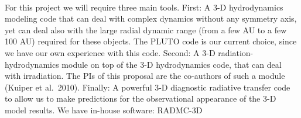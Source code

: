 \vspace{0.5em}
\\
%
For this project we will require three main tools.  First: A 3-D
hydrodynamics modeling code that can deal with complex dynamics without any
symmetry axis, yet can deal also with the large radial dynamic range (from a
few AU to a few 100 AU) required for these objects. The PLUTO code is our
current choice, since we have our own experience with this code.  Second: A
3-D radiation-hydrodynamics module on top of the 3-D hydrodynamics code,
that can deal with irradiation. The PIs of this proposal are the co-authors
of such a module (Kuiper et al.~2010). 
Finally: A powerful 3-D diagnostic radiative transfer code to allow us to
make predictions for the observational appearance of the 3-D model
results. We have in-house software: RADMC-3D

